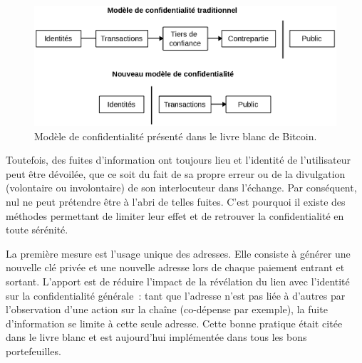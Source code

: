 \begin{figure}[h]
  \centering
  \includegraphics[scale=0.55]{img/white-paper-privacy-model-fr.eps}
  \caption{Modèle de confidentialité présenté dans le livre blanc de Bitcoin.}
\end{figure}

Toutefois, des fuites d'information ont toujours lieu et l'identité de l'utilisateur peut être dévoilée, que ce soit du fait de sa propre erreur ou de la divulgation (volontaire ou involontaire) de son interlocuteur dans l'échange. Par conséquent, nul ne peut prétendre être à l'abri de telles fuites. C'est pourquoi il existe des méthodes permettant de limiter leur effet et de retrouver la confidentialité en toute sérénité.

La première mesure est l'usage unique des adresses. Elle consiste à générer une nouvelle clé privée et une nouvelle adresse lors de chaque paiement entrant et sortant. L'apport est de réduire l'impact de la révélation du lien avec l'identité sur la confidentialité générale~: tant que l'adresse n'est pas liée à d'autres par l'observation d'une action sur la chaîne (co-dépense par exemple), la fuite d'information se limite à cette seule adresse. Cette bonne pratique était citée dans le livre blanc et est aujourd'hui implémentée dans tous les bons portefeuilles.

